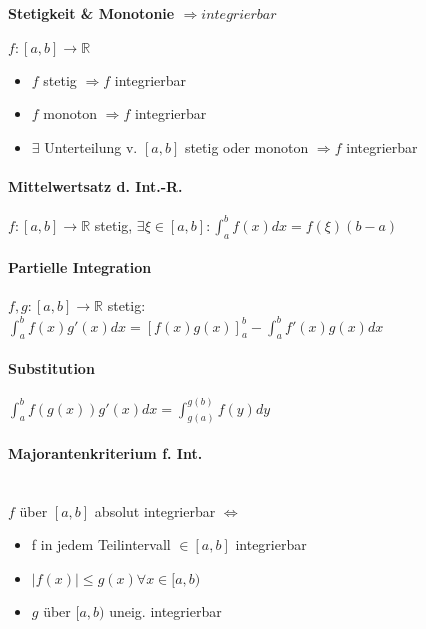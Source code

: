 \documentclass[paper=a3,paper=landscape, fontsize=9pt, DIV=30]{scrartcl}
\newcommand{\real}{{\mathbb{R}}}
\begin{document}
\begin{multicols*}{4}
  \paragraph{Stetigkeit \& Monotonie $\Rightarrow integrierbar$} $f: [a,b] \rightarrow \real$
  \begin{itemize}
  \item $f$ stetig $\Rightarrow f$ integrierbar
  \item $f$ monoton $\Rightarrow f$ integrierbar
  \item $\exists$ Unterteilung v. $[a,b]$ stetig oder monoton $\Rightarrow f$ integrierbar
  \end{itemize}


  \paragraph{Mittelwertsatz d. Int.-R.}
  $f:[a,b] \rightarrow \real$ stetig, $\exists \xi \in [a,b]: \int_{a}^{b}f(x)dx=f(\xi)(b-a)$


  \paragraph{Partielle Integration}
  $f,g: [a,b] \rightarrow \real$ stetig: $\int_{a}^{b}f(x)g'(x)dx=[f(x)g(x)]_a^b-\int_{a}^{b}f'(x)g(x) dx$


  \paragraph{Substitution}
  $\int_{a}^{b}f(g(x))g'(x)dx=\int_{g(a)}^{g(b)}f(y)dy$


  \paragraph{Majorantenkriterium f. Int.}\hspace{0pt} \\
  $f$ über $[a,b]$ absolut integrierbar $\Leftrightarrow$
  \begin{itemize}
  \item f in jedem Teilintervall $\in [a,b]$ integrierbar
  \item $\lvert f(x) \rvert \leq g(x) \forall x \in [a,b)$
  \item $g$ über $[a,b)$ uneig. integrierbar
  \end{itemize}


\end{multicols*}
\end{document}
